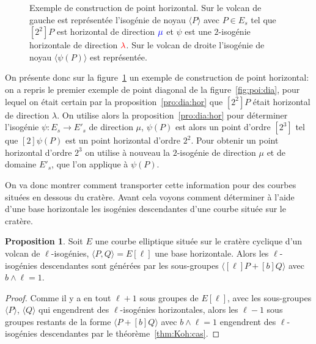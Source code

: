 \documentclass[10pt,a4paper]{book}
\theoremstyle{plain}
\theoremstyle{definition}
\theoremstyle{definition}
\theoremstyle{definition}
\newtheorem{prop}[thm]{Proposition}
\theoremstyle{definition}
\theoremstyle{remark}
\theoremstyle{remark}
\theoremstyle{definition}
\begin{document}
\begin{figure}
\begin{center}
\begin{tikzpicture}[scale=0.50]
\end{tikzpicture}
\end{center}
\caption{ \label{fig:poi:hor} Exemple de construction de point horizontal. 
Sur le volcan de gauche est représentée  l'isogénie de noyau $\langle P 
\rangle$ avec $P \in E_s$  tel que $[2^2]P$ est horizontal de direction 
$\color{blue}{\mu}$ et $\psi$ est une $2$-isogénie horizontale de direction 
$\color{red}{\lambda}$. Sur le volcan de droite l'isogénie de noyau $\langle 
\psi(P) \rangle$ est représentée.}
\end{figure}

On présente donc sur la figure~\ref{fig:poi:hor} un exemple de construction de 
point horizontal: on a repris le premier exemple de point 
diagonal de la figure~\ref{fig:poi:dia}, pour lequel on était certain par la 
proposition~\ref{pro:dia:hor} que $[2^2]P$ était horizontal de direction 
$\lambda$. On utilise alors la proposition~\ref{pro:dia:hor} pour déterminer 
l'isogénie $\psi:E_s \rightarrow E'_s$ de direction $\mu$, $\psi(P)$ est alors 
un point d'ordre $[2^3]$ tel que $[2]\psi(P)$
est un point horizontal d'ordre $2^2$. Pour obtenir un point horizontal d'ordre
$2^3$ on utilise à nouveau la $2$-isogénie de direction $\mu$ et de domaine
$E'_s$, que l'on applique à $\psi(P)$.

On va donc montrer comment transporter cette information pour des courbes 
situées en dessous du cratère. Avant cela voyons comment déterminer à l'aide 
d'une base horizontale les isogénies descendantes d'une courbe située sur le 
cratère.

\begin{prop}
Soit $E$ une courbe elliptique située sur le cratère cyclique d'un volcan de $\ell$-isogénies, $\langle P, Q \rangle= E[\ell]$ une base horizontale. Alors les $\ell$-isogénies descendantes sont générées par les sous-groupes $\langle [\ell]P+ [b]Q \rangle$ avec $b \wedge \ell =1$.
\end{prop}

\begin{proof}
Comme il y a en tout $\ell+1$ sous groupes de $E[\ell]$, avec les sous-groupes 
$\langle P \rangle$,  $\langle Q \rangle$ qui engendrent des $\ell$-isogénies 
horizontales, alors les $\ell-1$ sous groupes restants de la forme 
$\langle P+ [b] Q \rangle$ avec $b \wedge \ell =1$ engendrent des 
$\ell$-isogénies descendantes par le théorème~\ref{thm:Koh:cas}.
\end{proof}
\end{document}
